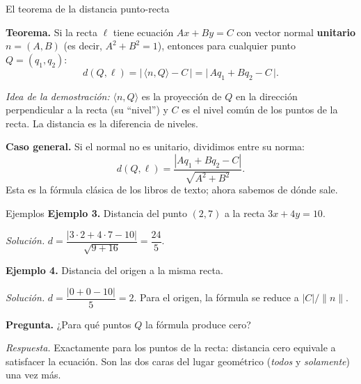 \documentclass[aspectratio=169,10pt]{beamer}
\newcommand{\destaca}[1]{%
  \par\vspace{3pt}\noindent
  \colorbox{turquesaClaro}{%
    \parbox{\dimexpr\linewidth-2\fboxsep\relax}{\vspace{3pt}#1\vspace{3pt}}}%
  \par\vspace{3pt}}
\newcommand{\pp}[2]{\langle #1,#2\rangle}
\newcommand{\norma}[1]{\lVert #1\rVert}
\begin{document}
\begin{frame}{El teorema de la distancia punto-recta}
  \destaca{\textbf{Teorema.} Si la recta $\ell$ tiene ecuación
  $Ax+By=C$ con vector normal \textbf{unitario} $n=(A,B)$ (es decir,
  $A^2+B^2=1$), entonces para cualquier punto $Q=(q_1,q_2)$:
  \[
    d(Q,\ell)=\bigl|\,\pp{n}{Q}-C\,\bigr|
    =\bigl|\,Aq_1+Bq_2-C\,\bigr| .
  \]}

  \vspace{0.1cm}
  \textit{Idea de la demostración:} $\pp{n}{Q}$ es la proyección de
  $Q$ en la dirección perpendicular a la recta (su ``nivel'') y $C$
  es el nivel común de los puntos de la recta. La distancia es la
  diferencia de niveles.

  \vspace{0.3cm}
  \destaca{\textbf{Caso general.} Si el normal no es unitario,
  dividimos entre su norma:
  \[
    d(Q,\ell)=\frac{|Aq_1+Bq_2-C|}{\sqrt{A^2+B^2}} .
  \]
  Esta es la fórmula clásica de los libros de texto; ahora sabemos de
  dónde sale.}
\end{frame}
\begin{frame}{Ejemplos}
  \textbf{Ejemplo 3.} Distancia del punto $(2,7)$ a la recta
  $3x+4y=10$.

  \vspace{0.1cm}

  {\small \textit{Solución.}
  $d=\dfrac{|3\cdot 2+4\cdot 7-10|}{\sqrt{9+16}}=\dfrac{24}{5}$.}

  \vspace{0.3cm}

  \textbf{Ejemplo 4.} Distancia del origen a la misma recta.

  \vspace{0.1cm}

  {\small \textit{Solución.} $d=\dfrac{|0+0-10|}{5}=2$. Para el
  origen, la fórmula se reduce a $|C|/\norma{n}$.}

  \vspace{0.3cm}

  \textbf{Pregunta.} ¿Para qué puntos $Q$ la fórmula produce cero?

  \vspace{0.2cm}
  \destaca{\small \textit{Respuesta.} Exactamente para los puntos de
  la recta: distancia cero equivale a satisfacer la ecuación. Son las
  dos caras del lugar geométrico (\textit{todos} y
  \textit{solamente}) una vez más.}
\end{frame}
\end{document}
